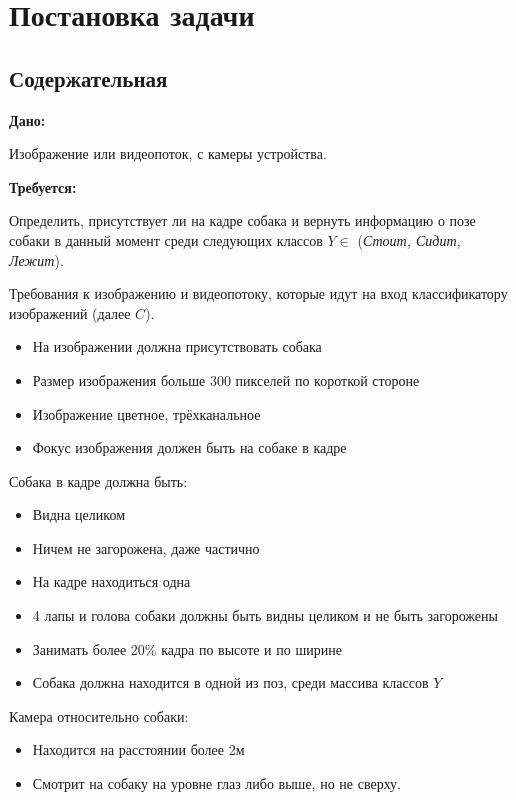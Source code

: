 \chapter{Постановка задачи} \label{chapt2}

\section{Содержательная} \label{sect2_1}
\textbf{Дано: } 

Изображение или видеопоток, с камеры устройства. 

\textbf{Требуется: } 

Определить, присутствует ли на кадре собака и вернуть информацию о позе собаки в данный момент среди следующих классов $Y \in$ (\emph{Стоит,  Сидит,  Лежит}).

Требования к изображению и видеопотоку, которые идут на вход классификатору изображений (далее $C$). 

\begin{itemize}
    \item На изображении должна присутствовать собака
    \item Размер изображения больше 300 пикселей по короткой стороне
    \item Изображение цветное, трёхканальное
    \item Фокус изображения должен быть на собаке в кадре
\end{itemize}

Собака в кадре должна быть:
\begin{itemize}
    \item Видна целиком
    \item Ничем не загорожена, даже частично
    \item На кадре находиться одна
    \item 4 лапы и голова собаки должны быть видны целиком и не быть загорожены
    \item Занимать более 20\% кадра по высоте и по ширине
    \item Собака должна находится в одной из поз, среди массива классов $Y$
 \end{itemize}
 
Камера относительно собаки:
\begin{itemize}
    \item Находится на расстоянии более 2м
    \item Смотрит на собаку на уровне глаз либо выше, но не сверху.
\end{itemize}

